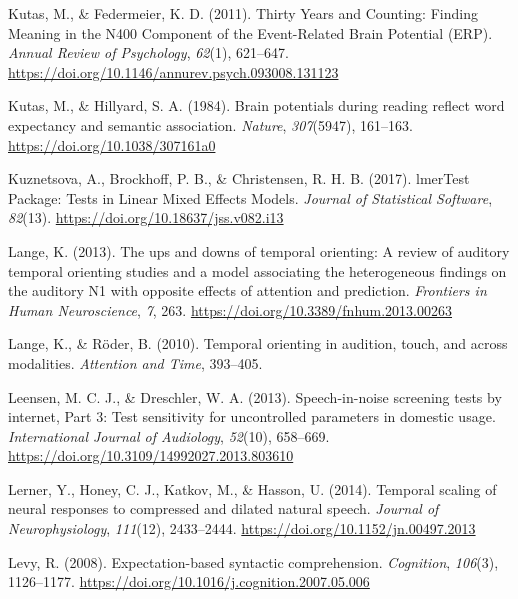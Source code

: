 \documentclass[a4paper, nobind]{templates/ociamthesis}
\newlength{\cslhangindent}
\newenvironment{CSLReferences}[2] %
 {%
  \setlength{\parindent}{0pt}
  \ifodd #1
  \let\oldpar\par
  \def\par{\hangindent=\cslhangindent\oldpar}
  \fi
  \setlength{\parskip}{1mm}
  \setlength{\baselineskip}{6mm}
 }%
 {}
\begin{document}
\begin{CSLReferences}{1}{0}
\leavevmode{}%
Kutas, M., \& Federmeier, K. D. (2011). Thirty Years and Counting: Finding Meaning in the N400 Component of the Event-Related Brain Potential (ERP). \emph{Annual Review of Psychology}, \emph{62}(1), 621--647. \url{https://doi.org/10.1146/annurev.psych.093008.131123}

\leavevmode{}%
Kutas, M., \& Hillyard, S. A. (1984). Brain potentials during reading reflect word expectancy and semantic association. \emph{Nature}, \emph{307}(5947), 161--163. \url{https://doi.org/10.1038/307161a0}

\leavevmode{}%
Kuznetsova, A., Brockhoff, P. B., \& Christensen, R. H. B. (2017). lmerTest Package: Tests in Linear Mixed Effects Models. \emph{Journal of Statistical Software}, \emph{82}(13). \url{https://doi.org/10.18637/jss.v082.i13}

\leavevmode{}%
Lange, K. (2013). {The ups and downs of temporal orienting: A review of auditory temporal orienting studies and a model associating the heterogeneous findings on the auditory N1 with opposite effects of attention and prediction}. \emph{Frontiers in Human Neuroscience}, \emph{7}, 263. \url{https://doi.org/10.3389/fnhum.2013.00263}

\leavevmode{}%
Lange, K., \& Röder, B. (2010). Temporal orienting in audition, touch, and across modalities. \emph{Attention and Time}, 393--405.

\leavevmode{}%
Leensen, M. C. J., \& Dreschler, W. A. (2013). {Speech-in-noise screening tests by internet, Part 3: Test sensitivity for uncontrolled parameters in domestic usage}. \emph{International Journal of Audiology}, \emph{52}(10), 658--669. \url{https://doi.org/10.3109/14992027.2013.803610}

\leavevmode{}%
Lerner, Y., Honey, C. J., Katkov, M., \& Hasson, U. (2014). {Temporal scaling of neural responses to compressed and dilated natural speech}. \emph{Journal of Neurophysiology}, \emph{111}(12), 2433--2444. \url{https://doi.org/10.1152/jn.00497.2013}

\leavevmode{}%
Levy, R. (2008). Expectation-based syntactic comprehension. \emph{Cognition}, \emph{106}(3), 1126--1177. \url{https://doi.org/10.1016/j.cognition.2007.05.006}


\end{CSLReferences}
\end{document}

